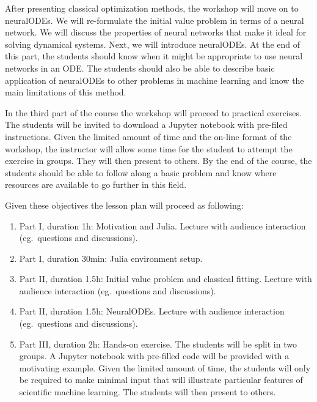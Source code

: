 \documentclass[10pt, a4paper]{article}
\begin{document}
After presenting classical optimization methods, the workshop will move on to neuralODEs. We will re-formulate the initial value problem in terms of a neural network. We will discuss the properties of neural networks that make it ideal for solving dynamical systems. Next, we will introduce neuralODEs. At the end of this part, the students should know when it might be appropriate to use neural networks in an ODE. The students should also be able to describe basic application of neuralODEs to other problems in machine learning and know the main limitations of this method.

In the third part of the course the workshop will proceed to practical exercises. The students will be invited to download a Jupyter notebook with pre-filed instructions. Given the limited amount of time and the on-line format of the workshop, the instructor will allow some time for the student to attempt the exercise in groups. They will then present to others. By the end of the course, the students should be able to follow along a basic problem and know where resources are available to go further in this field.

Given these objectives the lesson plan will proceed as following:

\begin{enumerate}

    \item Part I, duration 1h: Motivation and Julia. Lecture with audience interaction (eg.\ questions and discussions).

    \item Part I, duration 30min: Julia environment setup.

    \item Part II, duration 1.5h: Initial value problem and classical fitting. Lecture with audience interaction (eg.\ questions and discussions).

    \item Part II, duration 1.5h: NeuralODEs. Lecture with audience interaction (eg.\ questions and discussions).

    \item Part III, duration 2h: Hands-on exercise. The students will be split in two groups. A Jupyter notebook with pre-filled code will be provided with a motivating example. Given the limited amount of time, the students will only be required to make minimal input that will illustrate particular features of scientific machine learning. The students will then present to others.

\end{enumerate}
\end{document}
